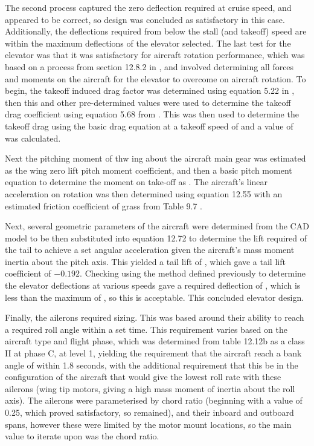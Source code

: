 \documentclass[../../main.tex]{subfiles}
\begin{document}
The second process captured the zero deflection required at cruise speed, and appeared to be correct, so design was concluded as satisfactory in this case.
Additionally, the deflections required from below the stall (and takeoff) speed are within the maximum deflections of the elevator selected.
The last test for the elevator was that it was satisfactory for aircraft rotation performance, which was based on a process from section 12.8.2 in \cite{sadraey-13}, and involved determining all forces and moments on the aircraft for the elevator to overcome on aircraft rotation.
To begin, the takeoff induced drag factor was determined using equation 5.22 in \cite{sadraey-13}, then this and other pre-determined values were used to determine the takeoff drag coefficient using equation 5.68 from \cite{sadraey-13}.
This was then used to determine the takeoff drag using the basic drag equation at a takeoff speed of  and a value of  was calculated.  

Next the pitching moment of thw ing about the aircraft main gear was estimated as the wing zero lift pitch moment coefficient, and then a basic pitch moment equation to determine the moment on take-off as .
The aircraft's linear acceleration on rotation was then determined using equation 12.55 \cite{sadraey-13} with an estimated friction coefficient of grass from Table 9.7 \cite{sadraey-13}. 

Next, several geometric parameters of the aircraft were determined from the CAD model to be then substituted into equation 12.72 \cite{sadraey-13} to determine the lift required of the tail to achieve a set angular acceleration given the aircraft's mass moment inertia about the pitch axis.
This yielded a tail lift of , which gave a tail lift coefficient of $-0.192$.
Checking using the method defined previously to determine the elevator deflections at various speeds gave a required deflection of , which is less than the maximum of , so this is acceptable.
This concluded elevator design. 

Finally, the ailerons required sizing.
This was based around their ability to reach a required roll angle within a set time.
This requirement varies based on the aircraft type and flight phase, which was determined from table 12.12b \cite{sadraey-13} as a class II at phase C, at level 1, yielding the requirement that the aircraft reach a bank angle of  within 1.8 seconds, with the additional requirement that this be in the configuration of the aircraft that would give the lowest roll rate with these ailerons (wing tip motors, giving a high mass moment of inertia about the roll axis).
The ailerons were parameterised by chord ratio (beginning with a value of 0.25, which proved satisfactory, so remained), and their inboard and outboard spans, however these were limited by the motor mount locations, so the main value to iterate upon was the chord ratio.  
\end{document}
